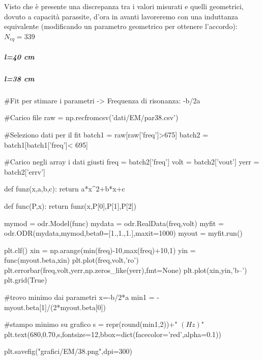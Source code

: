 Visto che è presente una discrepanza tra i valori misurati e quelli geometrici, dovuto a capacità parassite, d'ora in avanti lavoreremo con una induttanza equivalente (modificando un parametro geometrico per ottenere l'accordo): $N_{eq} = 339$

\subparagraph*{l=40 cm}

\subparagraph*{l=38 cm}

\begin{sagesilent}
#Fit per stimare i parametri -> Frequenza di risonanza: -b/2a

#Carico file
raw = np.recfromcsv('dati/EM/par38.csv')

#Seleziono dati per il fit
batch1 = raw[raw['freq']>675]
batch2 = batch1[batch1['freq']< 695]

#Carico negli array i dati giusti
freq = batch2['freq']
volt = batch2['vout']
yerr = batch2['errv']


def funz(x,a,b,c):
    return a*x^2+b*x+c

def func(P,x):
    return funz(x,P[0],P[1],P[2])

mymod = odr.Model(func)
mydata = odr.RealData(freq,volt)
myfit = odr.ODR(mydata,mymod,beta0=[1.,1.,1.],maxit=1000)
myout = myfit.run()

plt.clf()
xin = np.arange(min(freq)-10,max(freq)+10,1)
yin = func(myout.beta,xin)
plt.plot(freq,volt,'ro')
plt.errorbar(freq,volt,yerr,np.zeros_like(yerr),fmt=None)
plt.plot(xin,yin,'b--')
plt.grid(True)

#trovo minimo dai parametri x=-b/2*a
min1 = -myout.beta[1]/(2*myout.beta[0]) 

#stampo minimo su grafico
s = repr(round(min1,2))+" $(Hz)$"
plt.text(680,0.70,s,fontsize=12,bbox=dict(facecolor='red',alpha=0.1))

plt.savefig("grafici/EM/38.png",dpi=300)

\end{sagesilent}

